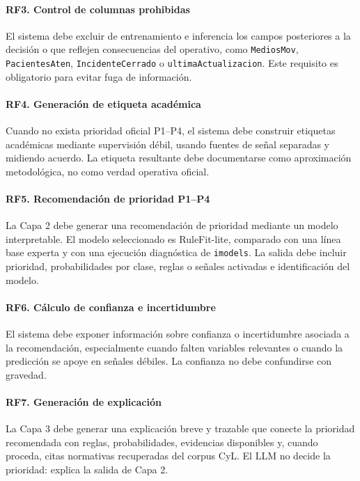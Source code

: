 \paragraph{RF3. Control de columnas prohibidas}
El sistema debe excluir de entrenamiento e inferencia los campos posteriores a la decisión o que reflejen consecuencias del operativo, como \texttt{MediosMov}, \texttt{PacientesAten}, \texttt{IncidenteCerrado} o \texttt{ultimaActualizacion}. Este requisito es obligatorio para evitar fuga de información.

\paragraph{RF4. Generación de etiqueta académica}
Cuando no exista prioridad oficial P1--P4, el sistema debe construir etiquetas académicas mediante supervisión débil, usando fuentes de señal separadas y midiendo acuerdo. La etiqueta resultante debe documentarse como aproximación metodológica, no como verdad operativa oficial.

\paragraph{RF5. Recomendación de prioridad P1--P4}
La Capa 2 debe generar una recomendación de prioridad mediante un modelo interpretable. El modelo seleccionado es RuleFit-lite, comparado con una línea base experta y con una ejecución diagnóstica de \texttt{imodels}. La salida debe incluir prioridad, probabilidades por clase, reglas o señales activadas e identificación del modelo.

\paragraph{RF6. Cálculo de confianza e incertidumbre}
El sistema debe exponer información sobre confianza o incertidumbre asociada a la recomendación, especialmente cuando falten variables relevantes o cuando la predicción se apoye en señales débiles. La confianza no debe confundirse con gravedad.

\paragraph{RF7. Generación de explicación}
La Capa 3 debe generar una explicación breve y trazable que conecte la prioridad recomendada con reglas, probabilidades, evidencias disponibles y, cuando proceda, citas normativas recuperadas del corpus CyL. El LLM no decide la prioridad: explica la salida de Capa 2.

